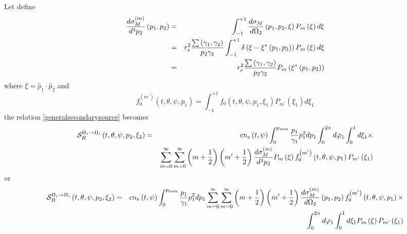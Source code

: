 Let define 
\begin{eqnarray}
\frac{d\sigma _{M}^{\left( m\right) }}{d^{3}p_{2}}\left( p_{1},p_{2}\right) 
&=&\int_{-1}^{+1}\frac{d\sigma _{M}}{d\Omega _{2}}\left( p_{1},p_{2},\xi
\right) P_{m}\left( \xi \right) d\xi   \notag \\
&=&r_{e}^{2}\frac{\sum \left( \gamma _{1},\gamma _{2}\right) }{p_{2}\gamma
_{2}}\int_{-1}^{+1}\delta \left( \xi -\xi ^{\ast }\left( p_{1},p_{2}\right)
\right) P_{m}\left( \xi \right) d\xi   \notag \\
&=&r_{e}^{2}\frac{\sum \left( \gamma _{1},\gamma _{2}\right) }{p_{2}\gamma
_{2}}P_{m}\left( \xi ^{\ast }\left( p_{1},p_{2}\right) \right) 
\end{eqnarray}%
where $\xi =\widehat{p}_{1}\cdot \widehat{p}_{2}$ and 
\begin{equation}
f_{0}^{\left( m^{\prime }\right) }\left( t,\theta ,\psi ,p_{1}\right)
=\int_{-1}^{+1}f_{0}\left( t,\theta ,\psi ,p_{1},\xi _{1}\right)
P_{m^{\prime }}\left( \xi _{1}\right) d\xi _{1}
\end{equation}%
the relation \ref{generalsecondarysource} becomes 
\begin{eqnarray}
\mathcal{S}_{R}^{\Pi _{i}\rightarrow \Pi _{i}}\left( t,\theta ,\psi
,p_{2},\xi _{2}\right)  &=&cn_{e}\left( t,\psi \right) \int_{0}^{p_{\max }}%
\frac{p_{1}}{\gamma _{1}}p_{1}^{2}dp_{1}\int_{0}^{2\pi }d\varphi
_{1}\int_{0}^{1}d\xi _{1}\times   \notag \\
&&\sum_{m=0}^{\infty }\sum_{m=0}^{\infty }\left( m+\frac{1}{2}\right) \left(
m^{\prime }+\frac{1}{2}\right) \frac{d\sigma _{M}^{\left( m\right) }}{%
d^{3}p_{2}}P_{m}\left( \xi \right) f_{0}^{\left( m^{\prime }\right) }\left(
t,\theta ,\psi ,p_{1}\right) P_{m^{\prime }}\left( \xi _{1}\right) 
\end{eqnarray}%
or 
\begin{eqnarray}
\mathcal{S}_{R}^{\Pi _{i}\rightarrow \Pi _{i}}\left( t,\theta ,\psi
,p_{2},\xi _{2}\right)  &=&cn_{e}\left( t,\psi \right) \int_{0}^{p_{\max }}%
\frac{p_{1}}{\gamma _{1}}p_{1}^{2}dp_{1}\sum_{m=0}^{\infty
}\sum_{m=0}^{\infty }\left( m+\frac{1}{2}\right) \left( m^{\prime }+\frac{1}{%
2}\right) \frac{d\sigma _{M}^{\left( m\right) }}{d\Omega _{2}}\left(
p_{1},p_{2}\right) f_{0}^{\left( m^{\prime }\right) }\left( t,\theta ,\psi
,p_{1}\right) \times   \notag \\
&&\int_{0}^{2\pi }d\varphi _{1}\int_{0}^{1}d\xi _{1}P_{m}\left( \xi \right)
P_{m^{\prime }}\left( \xi _{1}\right) 
\end{eqnarray}

